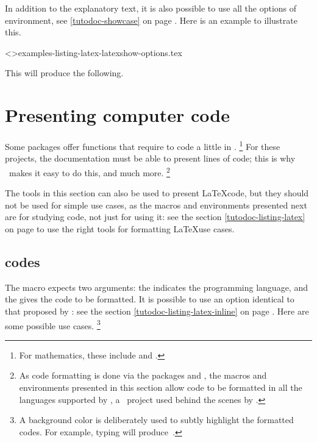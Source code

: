 

\begin{tdocexa}
    In addition to the explanatory text, it is also possible to use all the options of  environment, see \ref{tutodoc-showcase} on page \pageref{tutodoc-showcase}.
    Here is an example to illustrate this.

    \medskip

    \tdoclatexinput<>{examples-listing-latex-latexshow-options.tex}

    \smallskip

    This will produce the following.

    \smallskip

    
\end{tdocexa}


\section{Presenting computer code}

Some packages offer functions that require to code a little in \lua.%
\footnote{
	For mathematics, these include  and .
}
For these projects, the documentation must be able to present lines of code; this is why \thisproj\ makes it easy to do this, and much more.%
\footnote{
    As code formatting is done via the packages  and , the macros and environments presented in this section allow code to be formatted in all the languages supported by \pygmentsREF, a \python\ project used behind the scenes by .
}


\begin{tdocimp}
	The tools in this section can also be used to present \LaTeX code, but they should not be used for simple use cases, as the macros and environments presented next are for studying code, not just for using it: see the section \ref{tutodoc-listing-latex} on page \pageref{tutodoc-listing-latex} to use the right tools for formatting \LaTeX use cases.
\end{tdocimp}



\subsection{ codes}

The  macro expects two arguments: the  indicates the programming language, and the  gives the code to be formatted.
It is possible to use an option identical to that proposed by : see the section \ref{tutodoc-listing-latex-inline} on page \pageref{tutodoc-listing-latex-inline}.
Here are some possible use cases.%
\footnote{
    A background color is deliberately used to subtly highlight the formatted codes.
    For example, typing  will produce \,.
}

